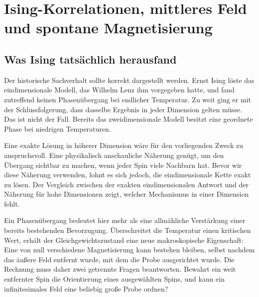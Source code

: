 \chapter{Ising-Korrelationen, mittleres Feld und spontane Magnetisierung}


\section{Was Ising tatsächlich herausfand}

Der historische Sachverhalt sollte korrekt dargestellt werden. Ernst Ising löste das eindimensionale Modell, das Wilhelm Lenz ihm vorgegeben hatte, und fand zutreffend keinen Phasenübergang bei endlicher Temperatur. Zu weit ging er mit der Schlussfolgerung, dass dasselbe Ergebnis in jeder Dimension gelten müsse. Das ist nicht der Fall. Bereits das zweidimensionale Modell besitzt eine geordnete Phase bei niedrigen Temperaturen.

Eine exakte Lösung in höherer Dimension wäre für den vorliegenden Zweck zu anspruchsvoll. Eine physikalisch anschauliche Näherung genügt, um den Übergang sichtbar zu machen, wenn jeder Spin viele Nachbarn hat. Bevor wir diese Näherung verwenden, lohnt es sich jedoch, die eindimensionale Kette exakt zu lösen. Der Vergleich zwischen der exakten eindimensionalen Antwort und der Näherung für hohe Dimensionen zeigt, welcher Mechanismus in einer Dimension fehlt.

Ein Phasenübergang bedeutet hier mehr als eine allmähliche Verstärkung einer bereits bestehenden Bevorzugung. Überschreitet die Temperatur einen kritischen Wert, erhält der Gleichgewichtszustand eine neue makroskopische Eigenschaft: Eine von null verschiedene Magnetisierung kann bestehen bleiben, selbst nachdem das äußere Feld entfernt wurde, mit dem die Probe ausgerichtet wurde. Die Rechnung muss daher zwei getrennte Fragen beantworten. Bewahrt ein weit entfernter Spin die Orientierung eines ausgewählten Spins, und kann ein infinitesimales Feld eine beliebig große Probe ordnen?

